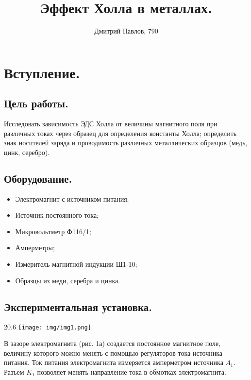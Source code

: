 \documentclass[12pt,a4paper]{article}
\author{Дмитрий Павлов, 790}
\title {\textbf{Эффект Холла в металлах.}}
\begin{document}
\maketitle
\newpage
\tableofcontents 

\newpage

\section{Вступление.}
    \subsection{Цель работы.}
        Исследовать зависимость ЭДС Холла от величины магнитного поля при различных токах через образец для определения константы Холла; определить знак носителей заряда и проводимость различных металлических образцов (медь, цинк, серебро).
        
    \subsection{Оборудование.}
        \begin{itemize}
            \item Электромагнит с источником питания;
            \item Источник постоянного тока;
            \item Микровольтметр Ф116/1;
            \item Амперметры;
            \item Измеритель магнитной индукции Ш1-10;
            \item Образцы из меди, серебра и цинка.
        \end{itemize}

    \subsection{Экспериментальная установка.}
        \begin{wrapfigure}{2}{0.6\linewidth}
        	\texttt{[image: img/img1.png]}
        	\hspace{44pt}{Рисунок 1 -- Схема установки для исследования эффекта Холла в металлах.}
        \end{wrapfigure}
        
        В зазоре электромагнита (рис. 1а) создается постоянное магнитное поле, величину которого можно менять с помощью регуляторов тока источника питания. Ток питания электромагнита измеряется амперметром источника $A_1$. Разъем $K_1$ позволяет менять направление тока в обмотках электромагнита.
        
\end{document}
